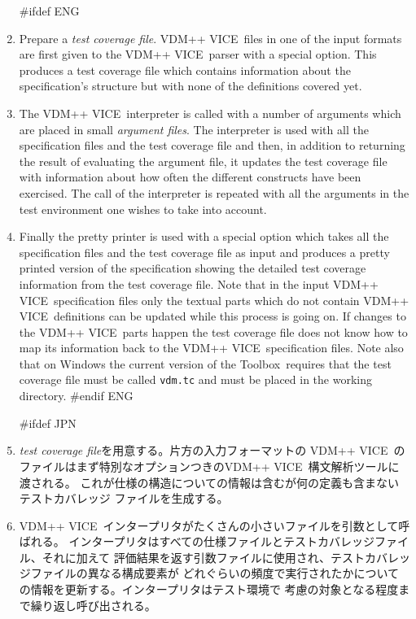 \documentclass[\pformat,12pt]{article}
\newcommand{\vdmslpp}{VDM-SL}
\newcommand{\Toolbox}{Toolbox}
\newcommand{\vdmslpp}{VDM++}
\newcommand{\Toolbox}{Toolbox}
\renewcommand{\vdmslpp}{VDM++ VICE}
\begin{document}
\begin{enumerate}

#ifdef ENG
\item Prepare a {\em test coverage file}.
  \vdmslpp\ files in one of the input formats are first given to the
  \vdmslpp\ parser with a special option. This produces a test
  coverage file which contains information about the specification's
  structure but with none of the  definitions covered yet.

\item The \vdmslpp\ interpreter is called with a number of arguments
   which are placed in small {\em argument files\/}. The interpreter is used
  with all the specification files and the test coverage file and
  then, in addition to returning the result of evaluating the argument
  file, it updates the test coverage file with information about how
  often the different constructs have been exercised. The call of the
  interpreter is repeated with all the arguments in the test
  environment one wishes to take into account.
  
\item Finally the pretty printer is used with a special option which
  takes all the specification files and the test coverage file as
  input and 
  produces a pretty printed version of the specification showing the
  detailed test coverage information from the test coverage file.
  Note that in the input \vdmslpp\ specification files only the
  textual parts which do not contain \vdmslpp\ definitions can be
  updated while this process is going on. If changes to the \vdmslpp\ 
  parts happen the test coverage file does not know how to map its
  information back to the \vdmslpp\ specification files. Note also that on
  Windows the current version of the \Toolbox\ requires that the test
  coverage file must be called \texttt{vdm.tc} and must be
  placed in the working directory.
#endif ENG

#ifdef JPN
\item
  {\em test coverage file}を用意する。片方の入力フォーマットの
  \vdmslpp\ のファイルはまず特別なオプションつきの\vdmslpp\ 構文解析ツールに渡される。
  これが仕様の構造についての情報は含むが何の定義も含まないテストカバレッジ
  ファイルを生成する。

\item
  \vdmslpp\ インタープリタがたくさんの小さいファイルを引数として呼ばれる。
  インタープリタはすべての仕様ファイルとテストカバレッジファイル、それに加えて
  評価結果を返す引数ファイルに使用され、テストカバレッジファイルの異なる構成要素が
  どれぐらいの頻度で実行されたかについての情報を更新する。インタープリタはテスト環境で
  考慮の対象となる程度まで繰り返し呼び出される。
  

\end{enumerate}
\end{document}
